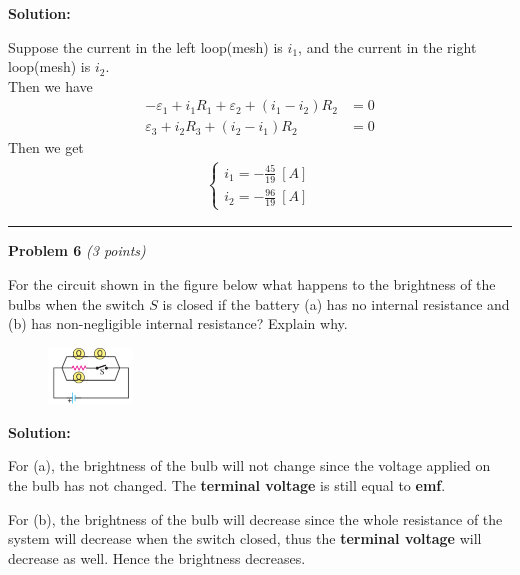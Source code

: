 \documentclass[a4paper, 11pt]{article}
\newenvironment{problem}[3][Problem]
    { \begin{mdframed}[backgroundcolor=gray!20] \textbf{#1 #2} \textit{(#3 points)} }
    {  \end{mdframed}}
\newenvironment{solution}
    {\textbf{Solution:}}
    {}
\begin{document}
\begin{solution}
	\par Suppose the current in the left loop(mesh) is $i_1$, and the current in the right loop(mesh) is $i_2$. \\
	Then we have
	\begin{align}
		-\varepsilon_1 + i_1R_1 + \varepsilon_2 + (i_1-i_2)R_2 & = 0 \\
		\varepsilon_3 + i_2R_3 + (i_2-i_1)R_2                  & = 0
	\end{align}
	Then we get
	\begin{align}
		\left\{
		\begin{array}{c}
			i_1 = -\frac{45}{19}\ [A] \\
			i_2 = -\frac{96}{19}\ [A]
		\end{array}
		\right.
	\end{align}
\end{solution}

\noindent\rule{7.1in}{2.8pt}

\begin{problem}{6}{3}
\par For the circuit shown in the figure below what happens to the brightness
of the bulbs when the switch $S$ is closed if the battery (a) has no internal
resistance and (b) has non-negligible internal resistance? Explain why.
\end{problem}
\begin{figure}[!htbp]
	\begin{small}
		\begin{center}
			\includegraphics[width=0.2\textwidth]{hw5_p6_question.png}
		\end{center}
	\end{small}
\end{figure}

\begin{solution}
	\par For (a), the brightness of the bulb will not change since the voltage applied
	on the bulb has not changed. The \textbf{terminal voltage} is still equal to \textbf{emf}.
	\par For (b), the brightness of the bulb will decrease since the whole resistance of the
	system will decrease when the switch closed, thus the \textbf{terminal voltage} will decrease
	as well. Hence the brightness decreases.
\end{solution}
\end{document}

